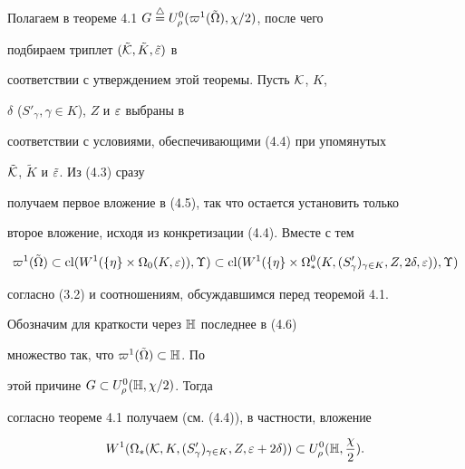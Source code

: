 \begin{pf} Полагаем в теореме 4.1 $G \stac


U^0_\rho(\varpi^1(\tilde\Omega), \chi / 2)$, после чего


подбираем триплет $(\tilde{\cal K}, \tilde K, \tilde{\varepsilon})$ в


соответствии с утверждением этой теоремы. Пусть ${\cal K}$, $K$,


$\delta$ ($S'_\gamma, \gamma \in K$), $Z$ и $\varepsilon$ выбраны в


соответствии с условиями, обеспечивающими (4.4) при упомянутых


$\tilde{\cal K}$, $\tilde K$ и $\tilde{\varepsilon}$. Из (4.3) сразу


получаем первое вложение в (4.5), так что остается установить только


второе вложение, исходя из конкретизации (4.4). Вместе с тем


%


\begin{equation}


\varpi^1(\tilde\Omega) \subset \cl(W^1(\{\eta\} \times \Omega_0(K,


\var)), \Upsilon) \subset


\cl(W^1(\{\eta\} \times \Omega_*^0(K,


(S'_\gamma)_{\gamma \in K}, Z, 2\delta, \var)), \Upsilon)


\end{equation}


%


согласно (3.2) и соотношениям, обсуждавшимся перед теоремой 4.1.


Обозначим для краткости через ${\Bbb H}$ последнее в (4.6)


множество так, что $\varpi^1(\tilde\Omega) \subset {\Bbb H}$. По


этой причине $G \subset U^0_\rho({\Bbb H}, \chi / 2)$. Тогда


согласно теореме 4.1 получаем (см. (4.4)), в частности, вложение


%


\begin{equation}


W^1(\Omega_*({\cal K}, K, (S'_\gamma)_{\gamma \in K}, Z, \var +


2\delta)) \subset U^0_\rho({\Bbb H}, \frac{\chi}{2}).


\end{equation}


%



\end{pf}
